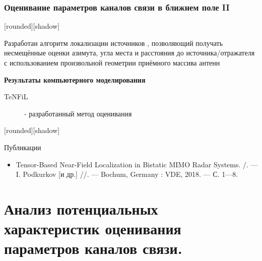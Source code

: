 \begin{frame}
	\frametitle{{\large Оценивание параметров каналов связи в ближнем поле II}}
	
	\begin{minipage}[t]{0.3\linewidth}
		{
			\small
			[shadow]
			\begin{block}{}
				Разработан алгоритм локализации источников \cite{Podkurkov2018}, позволяющий получать несмещённые оценки азимута, угла места и расстояния до источника/отражателя с использованием произвольной геометрии приёмного массива антенн		
			\end{block}
		}
	\end{minipage}
	\hfill
	\begin{minipage}[t]{0.64\linewidth}
		\begin{center}
			\textbf{Результаты компьютерного моделирования}
		\end{center}
		\vfill
		\begin{description}
			\item[TeNFiL] - разработанный метод оценивания
		\end{description}
	\end{minipage}
	\vfill
	{
		\footnotesize
		[rounded][shadow]
		\begin{block}{Публикации}
			\begin{itemize}
				\item Tensor-Based Near-Field Localization in Bistatic MIMO Radar
				Systems. /. — I. Podkurkov [и др.] //. — Bochum, Germany :
				VDE, 2018. — С. 1—8.
			\end{itemize}
		\end{block}
	}
\end{frame}

\section{Анализ потенциальных характеристик оценивания параметров каналов связи.}

